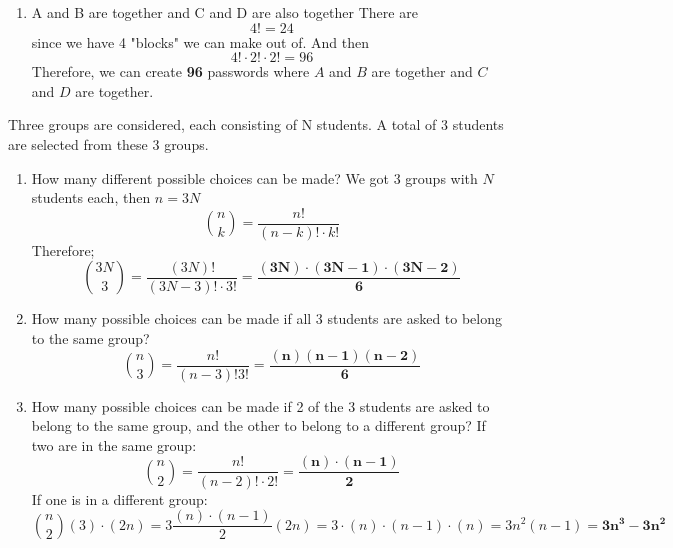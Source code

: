 \documentclass{article}
\begin{document}
\begin{minipage}{\linewidth}
\begin{solutions}
\begin{enumerate}[label=\alph*)]
                
                \item A and B are together and C and D are also together
                There are 
                \[
                4! = 24
                \] since we have 4 "blocks" we can make out of. And then
                \[
                4!\cdot 2!\cdot 2! = 96
                \]
                Therefore, we can create \textbf{96} passwords where $A$ and $B$ are together and $C$ and $D$ are together.
                
            \end{enumerate}
            \medskip
        \end{solutions}
    \end{minipage}


        \begin{solutions}
            Three groups are considered, each consisting of N students. A total of 3 students are selected from these 3 groups.
            \begin{enumerate}[label=\alph*)]
                \item How many different possible choices can be made?
                We got 3 groups with $N$ students each, then $n= 3N$
                \[
                \binom{n}{k} = \frac{n!}{(n-k)!\cdot k!}
                \]
                Therefore;
                \[
                \binom{3N}{3} = \frac{(3N)!}{(3N-3)! \cdot 3!} = \frac{\mathbf{(3N)\cdot(3N-1)\cdot(3N-2)}}{\mathbf{6}}
                \]

                \item How many possible choices can be made if all 3 students are asked to belong to the same group?
                \[
                \binom{n}{3} = \frac{n!}{(n-3)!3!}= \frac{\mathbf{(n)(n-1)(n-2)}}{\mathbf{6}}
                \]

                \item How many possible choices can be made if 2 of the 3 students are asked to belong to the same group, and the other to belong to a different group?
                If two are in the same group:
                \[
                    \binom{n}{2} = \frac{n!}{(n-2)!\cdot2!} = \frac{\mathbf{(n)\cdot(n-1)}}{\mathbf{2}}
                \]
                If one is in a different group:
                \[
                    \binom{n}{2} (3)\cdot(2n) = 3 \frac{(n)\cdot(n-1)}{2} (2n) =
                    3\cdot(n)\cdot(n-1)\cdot(n) = 3n^2(n-1) = \mathbf{3n^3-3n^2}
                \]
                
            \end{enumerate}
        \end{solutions}
\end{document}
